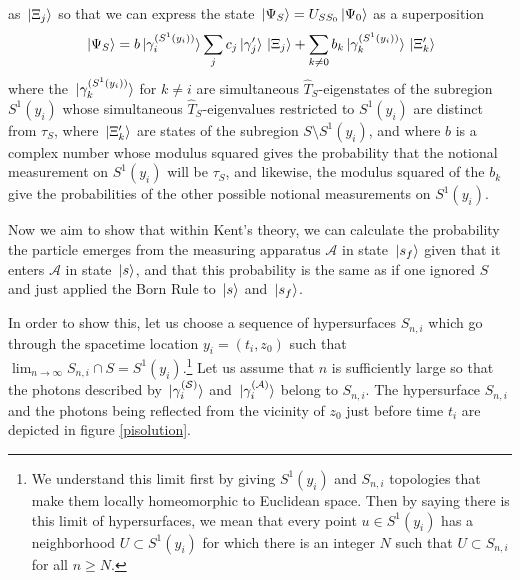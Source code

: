     as $\ket*{\Xi_j}$ so that we can express the state $\ket*{\Psi_S}=U_{SS_0}\ket*{\Psi_0}$ as a superposition
\begin{equation}\label{PsiSdecomp}
\ket*{\Psi_S}=b\ket*{\gamma_i^{(S^1(y_i))}}\sum_j c_j \ket*{\gamma_j'}\ket*{\Xi_j} +\sum_{k\neq 0} b_k\ket*{\gamma_k^{(S^1(y_i))}}\ket*{\Xi_k'}
\end{equation}
where the $\ket*{\gamma_k^{(S^1(y_i))}}$ %
%
 for $k\neq i$ are simultaneous $\hat{T}_S$-eigenstates of the subregion $S^1(y_i)$ whose simultaneous $\hat{T}_S$-eigenvalues restricted to $S^1(y_i)$ are distinct from $\tau_S$, where $\ket*{\Xi_k'}$ are states of the subregion $S\setminus S^1(y_i)$, and where $b$  %
  is a complex number whose modulus squared gives the probability that the notional measurement on $S^1(y_i)$ will be $\tau_S$, and likewise, the modulus squared of the $b_k$ give the probabilities of the other possible notional measurements on $S^1(y_i).$ 

Now we aim to show that within Kent's theory, we can calculate the probability the particle emerges from the measuring apparatus $\mathcal{A}$ in state $\ket*{s_{f}}$ given that it enters $\mathcal{A}$ in state $\ket*{s}$, and that this probability is the same as if one ignored $S$ and just applied the Born Rule to $\ket*{s}$ and $\ket*{s_f}$. 

In order to show this, let us choose a sequence of hypersurfaces $S_{n,i}$ %
%
which go through the spacetime location $y_i=(t_i, z_0)$ such that $\lim_{n\rightarrow\infty} S_{n,i}\cap S=S^1(y_i).$\footnote{We understand this limit first by giving $S^1(y_i)$ and $S_{n,i}$  topologies that make them locally homeomorphic to Euclidean space. Then by saying there is this limit of hypersurfaces, we mean that every point $u\in S^1(y_i)$ has a neighborhood $U\subset S^1(y_i)$ for which there is an integer $N$ such that $U\subset S_{n,i}$ for all $n\geq N$.} Let us assume that $n$ is sufficiently large so that the photons described by $\ket*{\gamma_i^{(\mathcal{S})}}$ and $\ket*{\gamma_i^{(\mathcal{A})}}$ belong to $S_{n,i}$. The hypersurface $S_{n,i}$ and the photons being reflected from the vicinity of $z_0$ just before time $t_i$ are  depicted in figure \ref{pisolution}.

